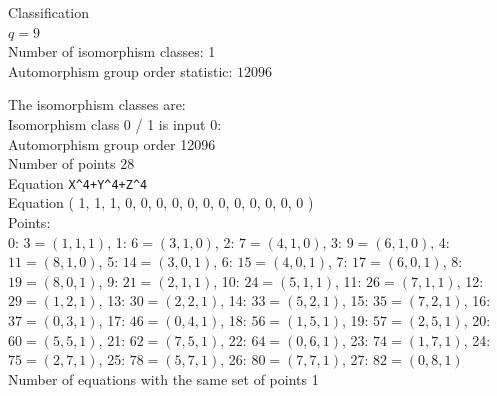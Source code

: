 Classification\\
$q=9$\\
Number of isomorphism classes: 1\\
Automorphism group order statistic: 
$12096$ \\

\bigskip

The isomorphism classes are:\\
Isomorphism class 0 / 1 is input 0:\\
Automorphism group order 12096\\
Number of points 28\\
Equation \verb'X^4+Y^4+Z^4'\\
Equation ( 1, 1, 1, 0, 0, 0, 0, 0, 0, 0, 0, 0, 0, 0, 0 )\\
Points:\\
0: $3 = ( 1, 1, 1 )$,
1: $6 = ( 3, 1, 0 )$,
2: $7 = ( 4, 1, 0 )$,
3: $9 = ( 6, 1, 0 )$,
4: $11 = ( 8, 1, 0 )$,
5: $14 = ( 3, 0, 1 )$,
6: $15 = ( 4, 0, 1 )$,
7: $17 = ( 6, 0, 1 )$,
8: $19 = ( 8, 0, 1 )$,
9: $21 = ( 2, 1, 1 )$,
10: $24 = ( 5, 1, 1 )$,
11: $26 = ( 7, 1, 1 )$,
12: $29 = ( 1, 2, 1 )$,
13: $30 = ( 2, 2, 1 )$,
14: $33 = ( 5, 2, 1 )$,
15: $35 = ( 7, 2, 1 )$,
16: $37 = ( 0, 3, 1 )$,
17: $46 = ( 0, 4, 1 )$,
18: $56 = ( 1, 5, 1 )$,
19: $57 = ( 2, 5, 1 )$,
20: $60 = ( 5, 5, 1 )$,
21: $62 = ( 7, 5, 1 )$,
22: $64 = ( 0, 6, 1 )$,
23: $74 = ( 1, 7, 1 )$,
24: $75 = ( 2, 7, 1 )$,
25: $78 = ( 5, 7, 1 )$,
26: $80 = ( 7, 7, 1 )$,
27: $82 = ( 0, 8, 1 )$
\\
Number of equations with the same set of points 1\\

\bigskip

